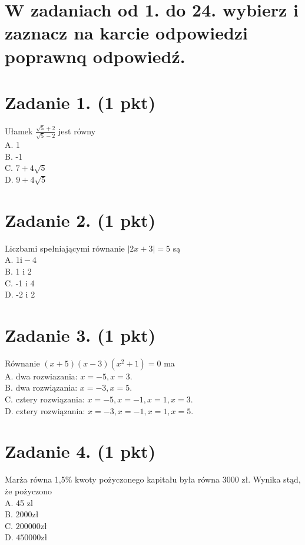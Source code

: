 \documentclass[10pt]{article}
\begin{document}
\section*{W zadaniach od 1. do 24. wybierz i zaznacz na karcie odpowiedzi poprawnq odpowiedź.}
\section*{Zadanie 1. (1 pkt)}
Ułamek \(\frac{\sqrt{5}+2}{\sqrt{5}-2}\) jest równy\\
A. 1\\
B. -1\\
C. \(7+4 \sqrt{5}\)\\
D. \(9+4 \sqrt{5}\)

\section*{Zadanie 2. (1 pkt)}
Liczbami spełniającymi równanie \(|2 x+3|=5\) są\\
A. \(1 \mathrm{i}-4\)\\
B. 1 i 2\\
C. -1 i 4\\
D. -2 i 2

\section*{Zadanie 3. (1 pkt)}
Równanie \((x+5)(x-3)\left(x^{2}+1\right)=0\) ma\\
A. dwa rozwiazania: \(x=-5, x=3\).\\
B. dwa rozwiązania: \(x=-3, x=5\).\\
C. cztery rozwiązania: \(x=-5, x=-1, x=1, x=3\).\\
D. cztery rozwiązania: \(x=-3, x=-1, x=1, x=5\).

\section*{Zadanie 4. (1 pkt)}
Marża równa 1,5\% kwoty pożyczonego kapitału była równa 3000 zł. Wynika stąd, że pożyczono\\
A. 45 zl\\
B. \(2000 \mathrm{zł}\)\\
C. \(200000 \mathrm{zł}\)\\
D. \(450000 \mathrm{zł}\)
\end{document}
